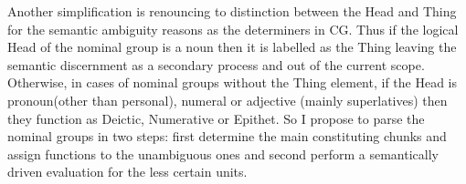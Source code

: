 	
	Another simplification is renouncing to distinction between the Head and Thing \citep[390--396]{Halliday2013} for the semantic ambiguity reasons as the determiners in CG. Thus if the logical Head of the nominal group is a noun then it is labelled as the Thing leaving the semantic discernment as a secondary process and out of the current scope. Otherwise, in cases of nominal groups without the Thing element, if the Head is pronoun(other than personal), numeral or adjective (mainly superlatives) then they function as Deictic, Numerative or Epithet. So I propose to parse the nominal groups in two steps: first determine the main constituting chunks and assign functions to the unambiguous ones and second perform a semantically driven evaluation for the less certain units.
	
